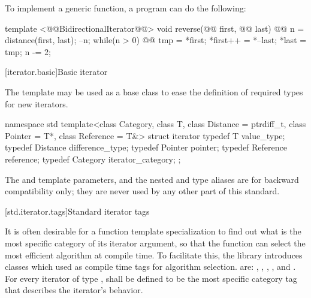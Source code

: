 \pnum
\enterexample
To implement a generic
function, a \Cpp program can do the following:

\begin{codeblock}
template <@@BidirectionalIterator@@>
void reverse(@@ first, @@ last) {
  @@ n =
    distance(first, last);
  --n;
  while(n > 0) {
    @@
      tmp = *first;
    *first++ = *--last;
    *last = tmp;
    n -= 2;
  }
}
\end{codeblock}
\exitexample

[iterator.basic]{Basic iterator}

\pnum
The
template may be used as a base class to ease the definition of required types
for new iterators.

\begin{codeblock}
namespace std {
  template<class Category, class T, class Distance = ptrdiff_t,
    class Pointer = T*, class Reference = T&>
  struct iterator {
    typedef T         value_type;
    typedef Distance  difference_type;
    typedef Pointer   pointer;
    typedef Reference reference;
    typedef Category  iterator_category;
  };
}
\end{codeblock}

\begin{addedblock}
\pnum
\enternote The  and  template parameters, and the nested 
and  type aliases are for backward compatibility only; they are never used by any
other part of this standard.\exitnote
\end{addedblock}

[std.iterator.tags]{Standard iterator tags}

\pnum
{}%
%
%
%
%
%
It is often desirable for a
function template specialization
to find out what is the most specific category of its iterator
argument, so that the function can select the most efficient algorithm at compile time.
To facilitate this, the
library introduces
classes which  used as compile time tags for algorithm selection.
 are:
,
,
,
,
and
.
For every iterator of type
,
shall be defined to be the most specific category tag that describes the
iterator's behavior.

